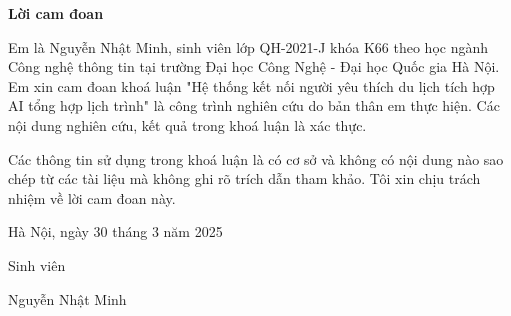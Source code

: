 \setcounter{page}{1}
\begin{center}
\textbf{\large{Lời cam đoan}	}
\end{center}
Em là Nguyễn Nhật Minh, sinh viên lớp QH-2021-J khóa K66 theo học ngành Công nghệ thông tin tại trường Đại học Công Nghệ - Đại học Quốc gia Hà Nội. Em xin cam đoan khoá luận "Hệ thống kết nối người yêu thích du lịch tích hợp AI tổng hợp lịch trình" là công trình nghiên cứu do bản thân em thực hiện. Các nội dung nghiên cứu, kết quả trong khoá luận là xác thực.

Các thông tin sử dụng trong khoá luận là có cơ sở và không có nội dung nào sao chép từ các tài liệu mà không ghi rõ trích dẫn tham khảo. Tôi xin chịu trách nhiệm về lời cam đoan này.

\begin{flushright}
Hà Nội, ngày 30 tháng 3 năm 2025
\end{flushright}

\begin{changemargin}{12cm}{2cm}
Sinh viên
\\[2cm]
\end{changemargin}

\begin{changemargin}{11cm}{1cm}
Nguyễn Nhật Minh
\end{changemargin}